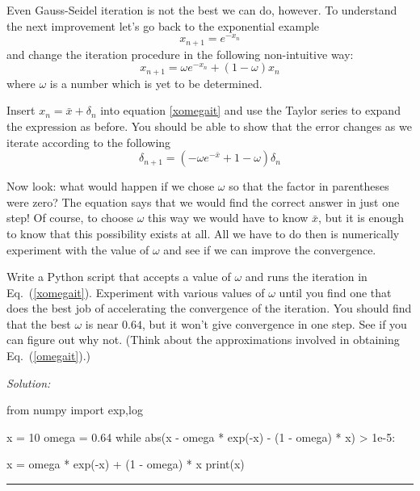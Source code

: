 
Even Gauss-Seidel iteration is not the best we can do, however.
To understand the next improvement let's go back to the
exponential example
\begin{equation}\label{eq:ExpAgain}
    x_{n+1}=e^{-x_n}
\end{equation}
and change the iteration procedure in the following
non-intuitive way:
\begin{equation}
    x_{n+1}=\omega e^{-x_n} + (1-\omega) x_n
    \label{xomegait}
\end{equation}
where $\omega$ is a number which is yet to be determined.
\begin{enumerate}
\probtwo Insert $x_n=\bar{x} + \delta_n$ into equation \eqref{xomegait}
and use the Taylor series to expand the expression as before.  You
should be able to show that the error changes as we
iterate according to the following
\begin{equation}
    \delta_{n+1} = ( - \omega e^{-\bar{x}} + 1-\omega) \delta_n
    \label{omegait}
\end{equation}
\end{enumerate}
Now look: what would happen if we chose $\omega$ so that the
factor in parentheses were zero? The equation says that we
would find the correct answer in just one step! Of course, to
choose $\omega$ this way we would have to know $\bar{x}$, but
it is enough to know that this possibility exists at all. All
we have to do then is numerically experiment with the value of
$\omega$ and see if we can improve the convergence.

\begin{enumerate}
\probtwo \label{P:19.3}
Write a Python script that accepts a value of $\omega$ and runs the
iteration in Eq.~(\ref{xomegait}). Experiment with various values of
$\omega$ until you find one that does the best job of accelerating
the convergence of the iteration. You should find that the best
$\omega$ is near $0.64$, but it won't give convergence in one step.
See if you can figure out why not. (Think about the approximations
involved in obtaining Eq.~(\ref{omegait}).)
\end{enumerate}
\ifsolutions
\textit{Solution:}\\
\begin{codeexample}
\begin{VerbatimOut}{\listingFile}
from numpy import exp,log


x = 10
omega = 0.64
while abs(x - omega * exp(-x) - (1 - omega) * x) > 1e-5:

    x = omega * exp(-x) + (1 - omega) * x
    print(x)

    
\end{VerbatimOut}
\end{codeexample}
\else
\noindent\rule{5 in}{0.01 in}
\fi


